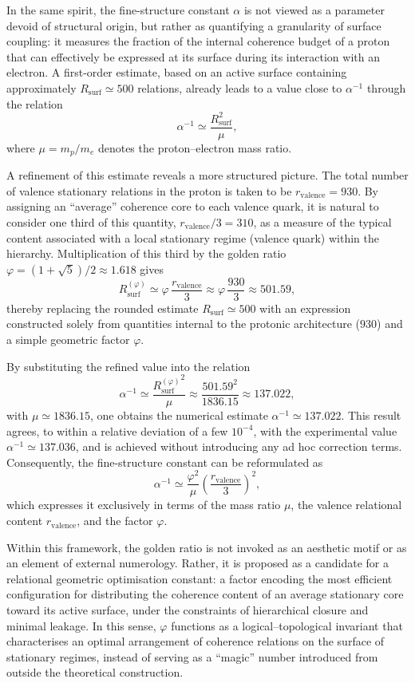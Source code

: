 \documentclass[11pt,a4paper]{article}
\begin{document}
In the same spirit, the fine-structure constant \(\alpha\) is not viewed as a parameter devoid of structural origin, but rather as quantifying a granularity of surface coupling: it measures the fraction of the internal coherence budget of a proton that can effectively be expressed at its surface during its interaction with an electron. A first-order estimate, based on an active surface containing approximately \(R_{\mathrm{surf}} \simeq 500\) relations, already leads to a value close to \(\alpha^{-1}\) through the relation
\[
\alpha^{-1} \simeq \frac{R_{\mathrm{surf}}^{2}}{\mu},
\]
where \(\mu = m_p/m_e\) denotes the proton–electron mass ratio.

A refinement of this estimate reveals a more structured picture. The total number of valence stationary relations in the proton is taken to be \(r_{\mathrm{valence}} = 930\). By assigning an “average” coherence core to each valence quark, it is natural to consider one third of this quantity, \(r_{\mathrm{valence}}/3 = 310\), as a measure of the typical content associated with a local stationary regime (valence quark) within the hierarchy. Multiplication of this third by the golden ratio \(\varphi = (1 + \sqrt{5})/2 \approx 1.618\) gives
\[
R_{\mathrm{surf}}^{(\varphi)}
\simeq \varphi \,\frac{r_{\mathrm{valence}}}{3}
\approx \varphi \,\frac{930}{3}
\approx 501.59,
\]
thereby replacing the rounded estimate \(R_{\mathrm{surf}} \simeq 500\) with an expression constructed solely from quantities internal to the protonic architecture (\(930\)) and a simple geometric factor \(\varphi\).

By substituting the refined value into the relation
\[
\alpha^{-1} \simeq \frac{{R_{\mathrm{surf}}^{(\varphi)}}^{2}}{\mu}
\approx \frac{501.59^{2}}{1836.15}
\approx 137.022,
\]
with \(\mu \simeq 1836.15\), one obtains the numerical estimate \(\alpha^{-1} \simeq 137.022\). This result agrees, to within a relative deviation of a few \(10^{-4}\), with the experimental value \(\alpha^{-1} \simeq 137.036\), and is achieved without introducing any ad hoc correction terms. Consequently, the fine-structure constant can be reformulated as
\[
\alpha^{-1}
\simeq \frac{\varphi^{2}}{\mu}
\left(\frac{r_{\mathrm{valence}}}{3}\right)^{2},
\]
which expresses it exclusively in terms of the mass ratio \(\mu\), the valence relational content \(r_{\mathrm{valence}}\), and the factor \(\varphi\). 

Within this framework, the golden ratio is not invoked as an aesthetic motif or as an element of external numerology. Rather, it is proposed as a candidate for a relational geometric optimisation constant: a factor encoding the most efficient configuration for distributing the coherence content of an average stationary core toward its active surface, under the constraints of hierarchical closure and minimal leakage. In this sense, \(\varphi\) functions as a logical–topological invariant that characterises an optimal arrangement of coherence relations on the surface of stationary regimes, instead of serving as a “magic” number introduced from outside the theoretical construction. 
\end{document}
